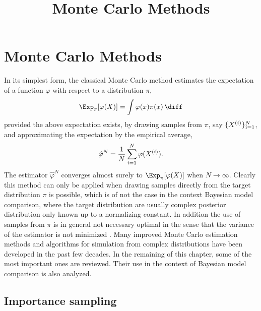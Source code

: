 \ifx\inthesis\undefined %

\title{Monte Carlo Methods}

\maketitle
\else %
\chapter{Monte Carlo Methods}
\label{cha:Monte Carlo Methods}
\fi %

In its simplest form, the classical Monte Carlo method estimates the
expectation of a function $\varphi$ with respect to a distribution $\pi$,
\begin{equation}
  \Exp_{\pi}[\varphi(X)] = \int\varphi(x)\pi(x)\intd
\end{equation}
provided the above expectation exists, by drawing \iid samples from $\pi$, say
$\{X^{(i)}\}_{i=1}^N$, and approximating the expectation by the empirical average,
\begin{equation}
  \hat\varphi^N = \frac{1}{N}\sum_{i=1}^N\varphi(X^{(i)}).
  \label{eq:vanilla mc}
\end{equation}
The estimator $\hat\varphi^N$ converges almost surely to
$\Exp_{\pi}[\varphi(X)]$ when $N\to\infty$.  Clearly this method can only be
applied when drawing samples directly from the target distribution $\pi$ is
possible, which is of not the case in the context Bayesian model comparison,
where the target distribution are usually complex posterior distribution only
known up to a normalizing constant. In addition the use of samples from $\pi$
is in general not necessary optimal in the sense that the variance of the
estimator is not minimized \parencite[see][sec.~3.3]{Robert:2004tn}. Many
improved Monte Carlo estimation methods and algorithms for simulation from
complex distributions have been developed in the past few decades. In the
remaining of this chapter, some of the most important ones are reviewed. Their
use in the context of Bayesian model comparison is also analyzed.

\section{Importance sampling}
\label{sec:Importance sampling}

